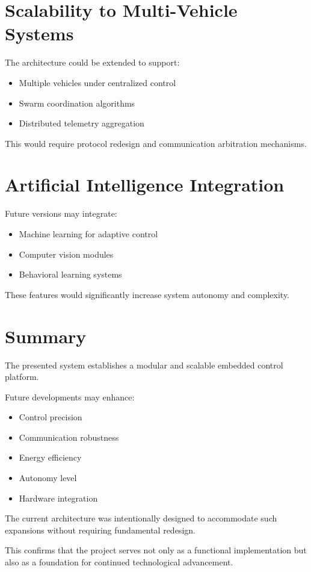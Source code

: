 \section{Scalability to Multi-Vehicle Systems}

The architecture could be extended to support:

\begin{itemize}
	\item Multiple vehicles under centralized control
	\item Swarm coordination algorithms
	\item Distributed telemetry aggregation
\end{itemize}

This would require protocol redesign and communication arbitration mechanisms.


\section{Artificial Intelligence Integration}

Future versions may integrate:

\begin{itemize}
	\item Machine learning for adaptive control
	\item Computer vision modules
	\item Behavioral learning systems
\end{itemize}

These features would significantly increase system autonomy and complexity.


\section{Summary}

The presented system establishes a modular and scalable embedded control platform.

Future developments may enhance:

\begin{itemize}
	\item Control precision
	\item Communication robustness
	\item Energy efficiency
	\item Autonomy level
	\item Hardware integration
\end{itemize}

The current architecture was intentionally designed to accommodate such expansions without requiring fundamental redesign.

This confirms that the project serves not only as a functional implementation but also as a foundation for continued technological advancement.